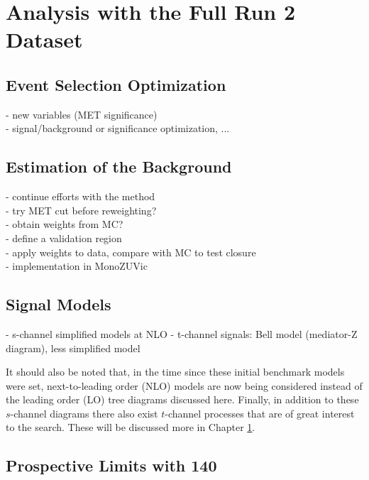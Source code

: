 \chapter{Analysis with the Full Run 2 Dataset}
\label{chapter:fullRun2}

\section{Event Selection Optimization}
- new variables (MET significance)\\
- signal/background or significance optimization, ...\\

\section{Estimation of the \Zjets Background}

- continue efforts with the \gjets method\\
- try MET cut before reweighting?\\
- obtain weights from MC?\\
- define a validation region\\
- apply weights to data, compare with MC to test closure\\
- implementation in MonoZUVic\\

\section{Signal Models}
- s-channel simplified models at NLO
- t-channel signals: Bell model (mediator-Z diagram), less simplified model

It should also be noted that, in the time since these initial benchmark models were set, next-to-leading order (NLO) models are now being considered instead of the leading order (LO) tree diagrams discussed here. Finally, in addition to these $s$-channel diagrams there also exist $t$-channel processes that are of great interest to the \monoZ search. These will be discussed more in Chapter \ref{chapter:fullRun2}.

\section{Prospective Limits with 140 \ifb}

